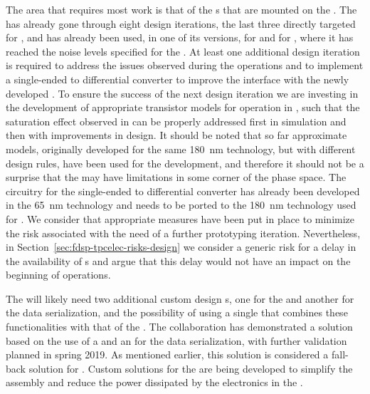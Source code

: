 The area that requires most work is that of the s that are mounted
on the . The   has already gone through eight design
iterations, the last three directly targeted for , and has already been used, 
in one of its versions, for  and for , where it has reached the 
noise levels specified for the  . At least one additional design iteration is
required to address the issues observed during the  operations and
to implement a single-ended to differential converter to improve the interface
with the newly developed . To ensure the success of the next 
design iteration we are investing in the development of appropriate transistor
models for operation in \lar, such that the saturation effect observed in 
 can be properly addressed first in simulation and then with improvements 
in design. It should be noted that so far approximate models, originally developed for 
the same \SI{180}{nm} technology, but with different design rules, have been used for 
the  development, and therefore it should not be a surprise
that the   may have limitations in some corner of the phase space.
The circuitry for the single-ended to differential converter has already been 
developed in the \SI{65}{nm} technology and needs to be ported to the \SI{180}{nm}
technology used for . We consider that appropriate measures have been
put in place to minimize the risk associated with the need of a further
prototyping iteration. Nevertheless, in Section~\ref{sec:fdsp-tpcelec-risks-design}
we consider a generic risk for a delay in the availability of s and
argue that this delay would not have an impact on the beginning of  operations.

The    will likely need two additional custom design s, one 
for the  and another for the data serialization, and the possibility of using a 
 single 
 that combines these functionalities with that of the . %
The collaboration has demonstrated a 
 solution based on the use of a   
and  an  for the data serialization, %
with further validation planned in spring 2019. 
As mentioned earlier, this solution %
is considered %
a fall-back solution for . %
Custom solutions for the  are being developed to
simplify the  assembly and reduce the power dissipated by the
electronics in the \lar. %

